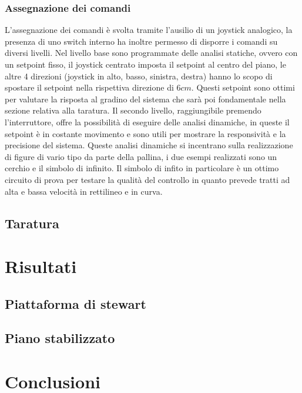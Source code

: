 \documentclass[12pt,twoside,openright]{article}
\begin{document}
\subsubsection{Assegnazione dei comandi}
L'assegnazione dei comandi è svolta tramite l'ausilio di un joystick analogico, la presenza di uno switch interno ha inoltre permesso di disporre i comandi su diversi livelli. Nel livello base sono programmate delle analisi statiche, ovvero con un setpoint fisso, il joystick centrato imposta il setpoint al centro del piano, le altre 4 direzioni (joystick in alto, basso, sinistra, destra) hanno lo scopo di spostare il setpoint nella rispettiva direzione di $6cm$. Questi setpoint sono ottimi per valutare la risposta al gradino del sistema che sarà poi fondamentale nella sezione relativa alla taratura. Il secondo livello, raggiungibile premendo l'interruttore, offre la possibilità di eseguire delle analisi dinamiche, in queste il setpoint è in costante movimento e sono utili per mostrare la responsività e la precisione del sistema. Queste analisi dinamiche si incentrano sulla realizzazione di figure di vario tipo da parte della pallina, i due esempi realizzati sono un cerchio e il simbolo di infinito. Il simbolo di infito in particolare è un ottimo circuito di prova per testare la qualità del controllo in quanto prevede tratti ad alta e bassa velocità in rettilineo e in curva.

\subsection{Taratura}\label{taratura}

\section{Risultati}
\subsection{Piattaforma di stewart}
\subsection{Piano stabilizzato}
\section{Conclusioni}
\end{document}
